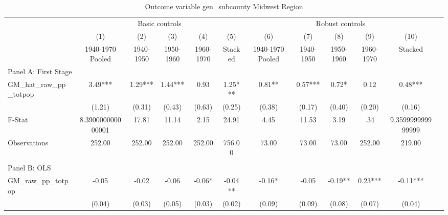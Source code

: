  \begin{table}[htbp]\centering {} \begin{threeparttable} \caption{Outcome variable gen\_subcounty Midwest Region} \begin{tabular}{l*{11}{c}} \toprule
          &\multicolumn{5}{c}{Basic controls}                                   &\multicolumn{5}{c}{Robust controls}                                  \\\cmidrule(lr){2-6}\cmidrule(lr){7-11}
          &\multicolumn{1}{c}{(1)}&\multicolumn{1}{c}{(2)}&\multicolumn{1}{c}{(3)}&\multicolumn{1}{c}{(4)}&\multicolumn{1}{c}{(5)}&\multicolumn{1}{c}{(6)}&\multicolumn{1}{c}{(7)}&\multicolumn{1}{c}{(8)}&\multicolumn{1}{c}{(9)}&\multicolumn{1}{c}{(10)}\\
          &\multicolumn{1}{c}{1940-1970 Pooled}&\multicolumn{1}{c}{1940-1950}&\multicolumn{1}{c}{1950-1960}&\multicolumn{1}{c}{1960-1970}&\multicolumn{1}{c}{Stacked}&\multicolumn{1}{c}{1940-1970 Pooled}&\multicolumn{1}{c}{1940-1950}&\multicolumn{1}{c}{1950-1960}&\multicolumn{1}{c}{1960-1970}&\multicolumn{1}{c}{Stacked}\\
\cmidrule(lr){1-11}
\multicolumn{10}{l}{Panel A: First Stage}\\
\cmidrule(lr){1-11}
GM\_hat\_raw\_pp\_totpop&      3.49***&      1.29***&      1.44***&      0.93   &      1.25***&      0.81** &      0.57***&      0.72*  &      0.12   &      0.48***\\
          &    (1.21)   &    (0.31)   &    (0.43)   &    (0.63)   &    (0.25)   &    (0.38)   &    (0.17)   &    (0.40)   &    (0.20)   &    (0.16)   \\
\midrule
F-Stat    &8.390000000000001   &     17.81   &     11.14   &      2.15   &     24.91   &      4.45   &     11.53   &      3.19   &       .34   &9.359999999999999   \\
Observations&    252.00   &    252.00   &    252.00   &    252.00   &    756.00   &     73.00   &     73.00   &     73.00   &    252.00   &    219.00   \\
\cmidrule[\heavyrulewidth](lr){1-11} \\ \cmidrule[\heavyrulewidth](lr){1-11}
\multicolumn{10}{l}{Panel B: OLS}\\
\cmidrule(lr){1-11}
GM\_raw\_pp\_totpop&     -0.05   &     -0.02   &     -0.06   &     -0.06*  &     -0.04** &     -0.16*  &     -0.05   &     -0.19** &      0.23***&     -0.11***\\
          &    (0.04)   &    (0.03)   &    (0.05)   &    (0.03)   &    (0.02)   &    (0.09)   &    (0.09)   &    (0.08)   &    (0.07)   &    (0.04)   \\

\end{tabular}
\end{threeparttable}
\end{table}
